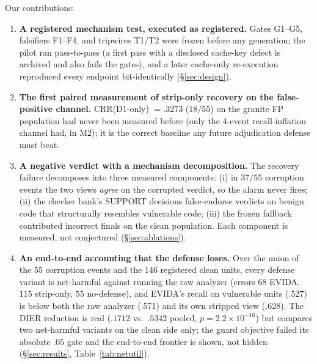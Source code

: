 \documentclass[sigconf,nonacm]{acmart}
\begin{document}
Our contributions:
\begin{enumerate}
  \item \textbf{A registered mechanism test, executed as registered.} Gates
  G1--G5, falsifiers F1--F4, and tripwires T1/T2 were frozen before any
  generation; the pilot ran pass-to-pass (a first pass with a disclosed
  cache-key defect is archived and also fails the gates), and a later
  cache-only re-execution reproduced every endpoint bit-identically
  (\S\ref{sec:design}).
  \item \textbf{The first paired measurement of strip-only recovery on the
  false-positive channel.} CRR(D1-only) $=.3273$ ($18/55$) on the granite
  FP population had never been measured before (only the 4-event
  recall-inflation channel had, in M2); it is the correct baseline any
  future adjudication defense must beat.
  \item \textbf{A negative verdict with a mechanism decomposition.} The
  recovery failure decomposes into three measured components: (i) in
  $37/55$ corruption events the two views \emph{agree} on the corrupted
  verdict, so the alarm never fires; (ii) the checker bank's SUPPORT
  decisions false-endorse verdicts on benign code that structurally
  resembles vulnerable code; (iii) the frozen fallback contributed
  incorrect finals on the clean population. Each component is measured,
  not conjectured (\S\ref{sec:ablations}).
  \item \textbf{An end-to-end accounting that the defense loses.} Over the
  union of the 55 corruption events and the 146 registered clean units,
  every defense variant is net-harmful against running the raw analyzer
  (errors $68$ EVIDA, $115$ strip-only, $55$ no-defense), and EVIDA's
  recall on vulnerable units (.527) is below both the raw analyzer (.571)
  and its own stripped view (.628). The DIER reduction is real
  ($.1712$ vs.\ $.5342$ pooled, $p{=}2.2{\times}10^{-16}$) but compares
  two net-harmful variants on the clean side only; the guard objective
  failed its absolute $.05$ gate and the end-to-end frontier is shown,
  not hidden (\S\ref{sec:results}, Table~\ref{tab:netutil}).
\end{enumerate}
\end{document}

